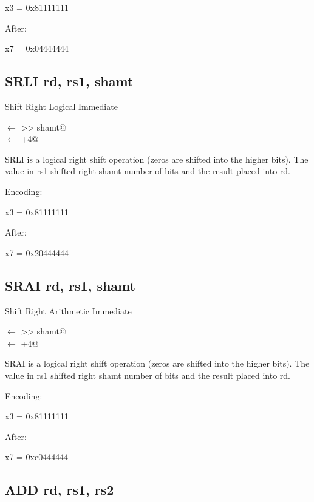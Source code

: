 x3 = 0x81111111

After:

x7 = 0x04444444

\subsection{SRLI rd, rs1, shamt}

Shift Right Logical Immediate

\verb@rd@ $\leftarrow$  >> shamt@\\
\verb@pc@ $\leftarrow$ \verb@pc+4@

SRLI is a logical right shift operation (zeros are shifted
into the higher bits).  The value in rs1 shifted right shamt
number of bits and the result placed into rd.~\cite[p.~14]{rvismv1v22:2017}


Encoding:


x3 = 0x81111111

After:

x7 = 0x20444444

\subsection{SRAI rd, rs1, shamt}

Shift Right Arithmetic Immediate

\verb@rd@ $\leftarrow$  >> shamt@\\
\verb@pc@ $\leftarrow$ \verb@pc+4@

SRAI is a logical right shift operation (zeros are shifted
into the higher bits).  The value in rs1 shifted right shamt
number of bits and the result placed into rd.~\cite[p.~14]{rvismv1v22:2017}

Encoding:


x3 = 0x81111111

After:

x7 = 0xe0444444


\subsection{ADD rd, rs1, rs2}

